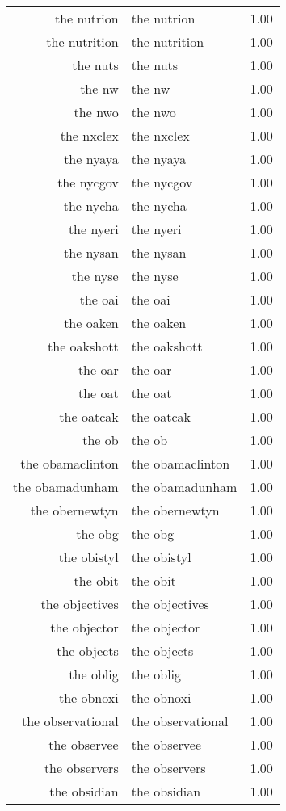 \begin{table}[ht]
\begin{tabular}{rlr}
  the nutrion & the nutrion & 1.00 \\ 
  the nutrition & the nutrition & 1.00 \\ 
  the nuts & the nuts & 1.00 \\ 
  the nw & the nw & 1.00 \\ 
  the nwo & the nwo & 1.00 \\ 
  the nxclex & the nxclex & 1.00 \\ 
  the nyaya & the nyaya & 1.00 \\ 
  the nycgov & the nycgov & 1.00 \\ 
  the nycha & the nycha & 1.00 \\ 
  the nyeri & the nyeri & 1.00 \\ 
  the nysan & the nysan & 1.00 \\ 
  the nyse & the nyse & 1.00 \\ 
  the oai & the oai & 1.00 \\ 
  the oaken & the oaken & 1.00 \\ 
  the oakshott & the oakshott & 1.00 \\ 
  the oar & the oar & 1.00 \\ 
  the oat & the oat & 1.00 \\ 
  the oatcak & the oatcak & 1.00 \\ 
  the ob & the ob & 1.00 \\ 
  the obamaclinton & the obamaclinton & 1.00 \\ 
  the obamadunham & the obamadunham & 1.00 \\ 
  the obernewtyn & the obernewtyn & 1.00 \\ 
  the obg & the obg & 1.00 \\ 
  the obistyl & the obistyl & 1.00 \\ 
  the obit & the obit & 1.00 \\ 
  the objectives & the objectives & 1.00 \\ 
  the objector & the objector & 1.00 \\ 
  the objects & the objects & 1.00 \\ 
  the oblig & the oblig & 1.00 \\ 
  the obnoxi & the obnoxi & 1.00 \\ 
  the observational & the observational & 1.00 \\ 
  the observee & the observee & 1.00 \\ 
  the observers & the observers & 1.00 \\ 
  the obsidian & the obsidian & 1.00 \\ 

\end{tabular}
\end{table}
